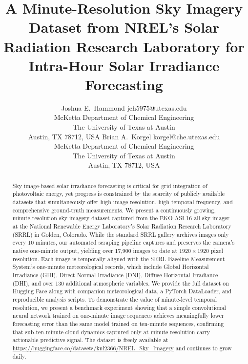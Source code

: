 \documentclass[twoside,11pt]{article}
\begin{document}
\title{A Minute-Resolution Sky Imagery Dataset from NREL's Solar Radiation Research Laboratory for Intra-Hour Solar Irradiance Forecasting}

\author{\name Joshua E.\ Hammond \email jeh5975@utexas.edu \\
       \addr McKetta Department of Chemical Engineering\\
       The University of Texas at Austin\\
       Austin, TX 78712, USA
       \AND
       \name Brian A.\ Korgel \email korgel@che.utexas.edu \\
       \addr McKetta Department of Chemical Engineering\\
       The University of Texas at Austin\\
       Austin, TX 78712, USA}


\maketitle

\begin{abstract}%
Sky image-based solar irradiance forecasting is critical for grid integration of photovoltaic energy, yet progress is constrained by the scarcity of publicly available datasets that simultaneously offer high image resolution, high temporal frequency, and comprehensive ground-truth measurements. We present a continuously growing, minute-resolution sky imagery dataset captured from the EKO ASI-16 all-sky imager at the National Renewable Energy Laboratory's Solar Radiation Research Laboratory (SRRL) in Golden, Colorado. While the standard SRRL gallery archives images only every 10 minutes, our automated scraping pipeline captures and preserves the camera's native one-minute output, yielding over 17,900 images to date at $1920 \times 1920$ pixel resolution. Each image is temporally aligned with the SRRL Baseline Measurement System's one-minute meteorological records, which include Global Horizontal Irradiance (GHI), Direct Normal Irradiance (DNI), Diffuse Horizontal Irradiance (DHI), and over 130 additional atmospheric variables. We provide the full dataset on Hugging Face along with companion meteorological data, a PyTorch DataLoader, and reproducible analysis scripts. To demonstrate the value of minute-level temporal resolution, we present a benchmark experiment showing that a simple convolutional neural network trained on one-minute image sequences achieves meaningfully lower forecasting error than the same model trained on ten-minute sequences, confirming that sub-ten-minute cloud dynamics captured only at minute resolution carry actionable predictive signal. The dataset is freely available at \url{https://huggingface.co/datasets/knl2366/NREL_Sky_Imagery} and continues to grow daily.
\end{abstract}
\end{document}
